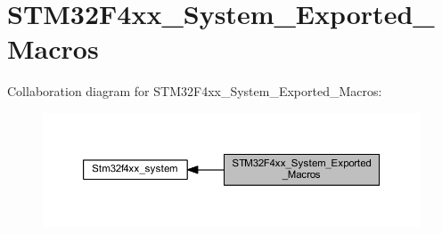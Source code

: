 \hypertarget{group___s_t_m32_f4xx___system___exported___macros}{}\section{S\+T\+M32\+F4xx\+\_\+\+System\+\_\+\+Exported\+\_\+\+Macros}
\label{group___s_t_m32_f4xx___system___exported___macros}
Collaboration diagram for S\+T\+M32\+F4xx\+\_\+\+System\+\_\+\+Exported\+\_\+\+Macros\+:
\nopagebreak
\begin{figure}[H]
\begin{center}
\leavevmode
\includegraphics[width=350pt]{group___s_t_m32_f4xx___system___exported___macros}
\end{center}
\end{figure}
